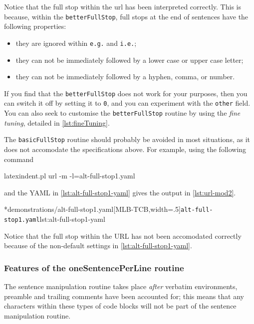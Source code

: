 	Notice that the full stop within the url has been interpreted correctly. This is because,
	within the \texttt{betterFullStop}, full stops at the end of sentences have the
	following properties:
	\begin{itemize}
		\item they are ignored within \texttt{e.g.} and \texttt{i.e.};
		\item they can not be immediately followed by a lower case or upper case letter;
		\item they can not be immediately followed by a hyphen, comma, or number.
	\end{itemize}
	If you find that the \texttt{betterFullStop} does not work for your purposes, then
	you can switch it off by setting it to \texttt{0}, and you can
	experiment with the \texttt{other}
	field.%
	 You can also seek
	to customise the \texttt{betterFullStop} routine by using the
	\emph{fine tuning}, detailed in \vref{lst:fineTuning}.

	The \texttt{basicFullStop} routine should probably be avoided in most situations, as
	it does not accomodate the specifications above. For example, using the following command
	\begin{commandshell}
latexindent.pl url -m -l=alt-full-stop1.yaml
\end{commandshell}
	and the YAML in \cref{lst:alt-full-stop1-yaml} gives the output in
	\cref{lst:url-mod2}.

	\begin{cmhtcbraster}[ raster left skip=-3.5cm,
			raster right skip=-2cm,
			raster force size=false,
			raster column 1/.style={add to width=.1\textwidth},
			raster column skip=.06\linewidth]
		\cmhlistingsfromfile[style=yaml-LST]*{demonstrations/alt-full-stop1.yaml}[MLB-TCB,width=.5\textwidth]{\texttt{alt-full-stop1.yaml}}{lst:alt-full-stop1-yaml}
	\end{cmhtcbraster}

	Notice that the full stop within the URL has not been accomodated correctly because of
	the non-default settings in \cref{lst:alt-full-stop1-yaml}.

\subsubsection{Features of the oneSentencePerLine routine}
	The sentence manipulation routine takes place \emph{after} verbatim
	environments, preamble and trailing comments have been accounted for; this means that any
	characters within these types of code blocks will not be part of the sentence
	manipulation routine.

